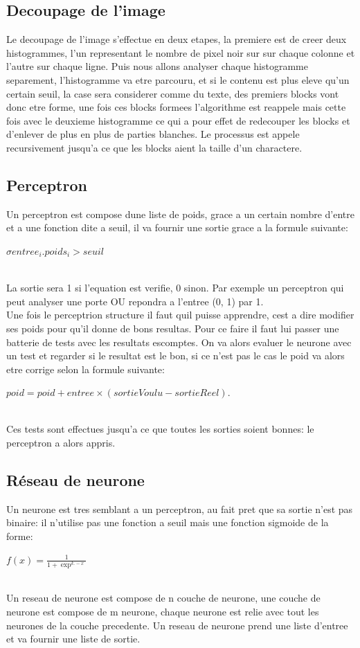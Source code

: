 \documentclass[12pt]{article}
\begin{document}
\subsection{Decoupage de l'image}
Le decoupage de l'image s'effectue en deux etapes, la premiere est de creer deux histogrammes, l'un representant le nombre de pixel noir sur sur chaque colonne et l'autre sur chaque ligne. Puis nous allons analyser chaque histogramme separement, l'histogramme va etre parcouru, et si le contenu est plus eleve qu'un certain seuil, la case sera considerer comme du texte, des premiers blocks vont donc etre forme, une fois ces blocks formees l'algorithme est reappele mais cette fois avec le deuxieme histogramme ce qui a pour effet de redecouper les blocks et d'enlever de plus en plus de parties blanches. Le processus est appele recursivement jusqu'a ce que les blocks aient la taille d'un charactere.
\newpage
\subsection{Perceptron}
Un perceptron est compose dune liste de poids, grace a un certain nombre d'entre et a une fonction dite a seuil, il va fournir une sortie grace a la formule suivante:
\\
\begin{center}
$\sigma entree_{i}.poids_{i} > seuil$
\end{center}
\\
 La sortie sera 1 si l'equation est verifie, 0 sinon. Par exemple un perceptron qui peut analyser une porte OU repondra a l'entree (0, 1) par 1.
\\
Une fois le perceptrion structure il faut quil puisse apprendre, cest a dire modifier ses poids pour qu'il donne de bons resultas. Pour ce faire il faut lui passer une batterie de tests avec les resultats escomptes. On va alors evaluer le neurone avec un test et regarder si le resultat est le bon, si ce n'est pas le cas le poid va alors etre corrige selon la formule suivante: 
\\
\begin{center}
$poid = poid + entree \times (sortieVoulu - sortieReel)$.
\end{center}
\\
 Ces tests sont effectues jusqu'a ce que toutes les sorties soient bonnes: le perceptron a alors appris.

\subsection{Réseau de neurone}
Un neurone est tres semblant a un perceptron, au fait pret que sa sortie n'est pas binaire: il n'utilise pas une fonction a seuil mais une fonction sigmoide de la forme:
\\
\begin{center}
$f(x) = \frac{1}{ 1 + \exp ^{k.-x}}$
\end{center}
\\
Un reseau de neurone est compose de n couche de neurone, une couche de neurone est compose de m neurone, chaque neurone est relie avec tout les neurones de la couche precedente. Un reseau de neurone prend une liste d'entree et va fournir une liste de sortie.
\newpage
\end{document}
